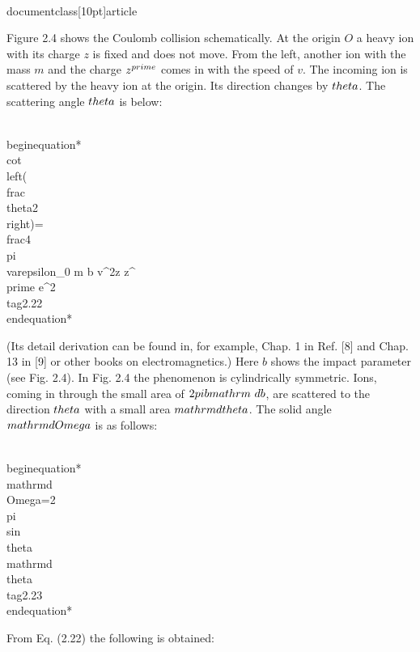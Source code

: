 \\documentclass[10pt]{article}
\begin{document}
Figure 2.4 shows the Coulomb collision schematically. At the origin $O$ a heavy ion with its charge $z$ is fixed and does not move. From the left, another ion with the mass $m$ and the charge $z^{\\prime}$ comes in with the speed of $v$. The incoming ion is scattered by the heavy ion at the origin. Its direction changes by $\\theta$. The scattering angle $\\theta$ is below:


\\begin{equation*}
\\cot \\left(\\frac{\\theta}{2}\\right)=\\frac{4 \\pi \\varepsilon_{0} m b v^{2}}{z z^{\\prime} e^{2}} \\tag{2.22}
\\end{equation*}


(Its detail derivation can be found in, for example, Chap. 1 in Ref. [8] and Chap. 13 in [9] or other books on electromagnetics.) Here $b$ shows the impact parameter (see Fig. 2.4). In Fig. 2.4 the phenomenon is cylindrically symmetric. Ions, coming in through the small area of $2 \\pi b \\mathrm{~d} b$, are scattered to the direction $\\theta$ with a small area $\\mathrm{d} \\theta$. The solid angle $\\mathrm{d} \\Omega$ is as follows:


\\begin{equation*}
\\mathrm{d} \\Omega=2 \\pi \\sin \\theta \\mathrm{d} \\theta \\tag{2.23}
\\end{equation*}


From Eq. (2.22) the following is obtained:
\end{document}
